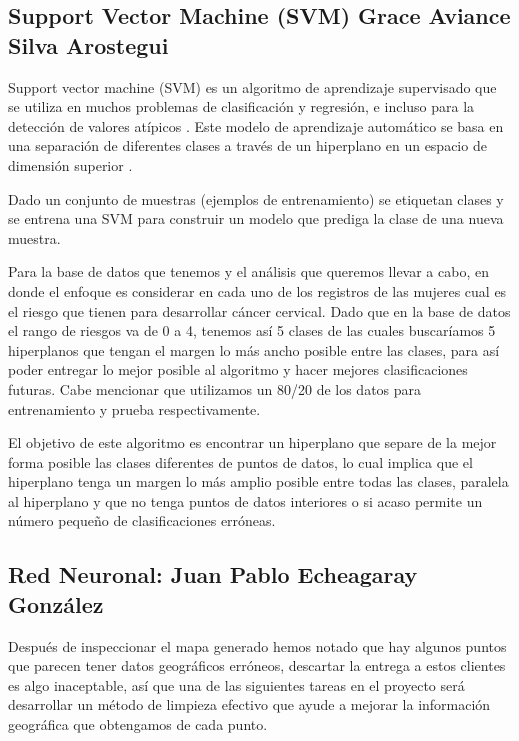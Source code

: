 \documentclass[journal]{IEEEtran}                                                          %
\begin{document}
        \subsection{Support Vector Machine (SVM) Grace Aviance Silva Arostegui} \label{svm}
            
            Support vector machine  (SVM) es un algoritmo de aprendizaje supervisado que se utiliza en muchos problemas de clasificación y regresión, e incluso para la detección de valores atípicos \cite{geron-2019}. Este modelo de aprendizaje automático se basa en una separación de diferentes clases a través de un hiperplano en un espacio de dimensión superior \cite{deisenroth2020mathematics}.

            Dado un conjunto de muestras (ejemplos de entrenamiento) se etiquetan clases y se entrena una SVM para construir un modelo que prediga la clase de una nueva muestra.

            Para la base de datos que tenemos y el análisis que queremos llevar a cabo, en donde el enfoque es considerar en cada uno de los registros de las mujeres cual es el riesgo que tienen para desarrollar cáncer cervical. Dado que en la base de datos el rango de riesgos va de 0 a 4, tenemos así 5 clases de las cuales buscaríamos 5 hiperplanos que tengan el margen lo más ancho posible entre las clases, para así poder entregar lo mejor posible al algoritmo y hacer mejores clasificaciones futuras. Cabe mencionar que utilizamos un 80/20 de los datos para entrenamiento y prueba respectivamente.

            El objetivo de este algoritmo es encontrar un hiperplano que separe de la mejor forma posible las clases diferentes de puntos de datos, lo cual implica que el hiperplano tenga un margen lo más amplio posible entre todas las clases, paralela al hiperplano y que no tenga puntos de datos interiores o si acaso permite un número pequeño de clasificaciones erróneas.

        \subsection{Red Neuronal: Juan Pablo Echeagaray González} \label{neural-network}
            Después de inspeccionar el mapa generado hemos notado que hay algunos puntos que parecen tener datos geográficos erróneos, descartar la entrega a estos clientes es algo inaceptable, así que una de las siguientes tareas en el proyecto será desarrollar un método de limpieza efectivo que ayude a mejorar la información geográfica que obtengamos de cada punto.
\end{document}

